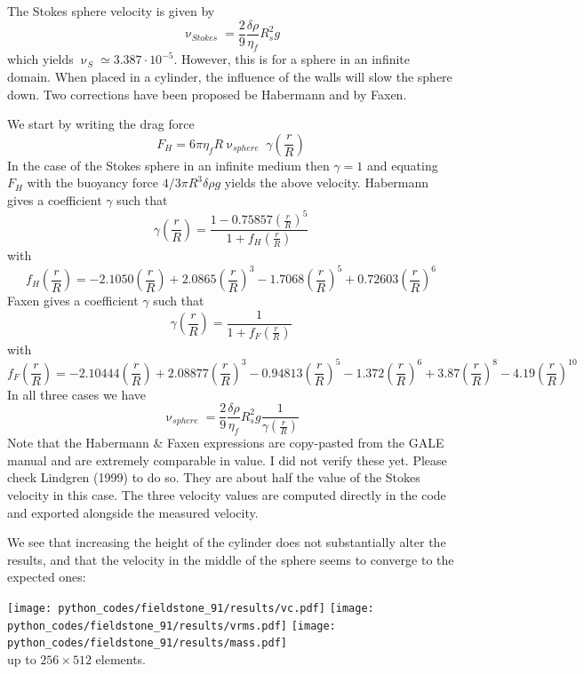 The Stokes sphere velocity is given by
\[
\upnu_{Stokes} = \frac{2}{9} \frac{\delta \rho}{\eta_f} R_s^2 g
\]
which yields $\upnu_S\simeq 3.387 \cdot 10^{-5}$. However, 
this is for a sphere in an infinite domain. When placed in a 
cylinder, the influence of the walls will slow the sphere down. 
Two corrections have been proposed be Habermann and by Faxen.

We start by writing the drag force
\[
F_H = 6 \pi \eta_f R \upnu_{sphere}\;  \gamma\left(\frac{r}{R}\right) 
\]
In the case of the Stokes sphere in an infinite medium then $\gamma =1$ and equating
$F_H$ with the buoyancy force $4/3 \pi R^3 \delta\rho g$ yields the above velocity.
Habermann gives a coefficient $\gamma$ such that 
\[
\gamma\left(\frac{r}{R}\right)  = 
\frac{1-0.75857 \left(\frac{r}{R}\right)^5}{1+f_H\left(\frac{r}{R}\right)}
\]
with 
\[
f_H\left(\frac{r}{R}\right) 
= -2.1050\left(\frac{r}{R}\right)+ 2.0865\left(\frac{r}{R}\right)^3
- 1.7068\left(\frac{r}{R}\right)^5 + 0.72603\left(\frac{r}{R}\right)^6 
\]
Faxen gives a coefficient $\gamma$ such that 
\[
\gamma\left(\frac{r}{R}\right) = \frac{1}{1 + f_F\left(\frac{r}{R}\right)} 
\]
with 
\[
f_F\left(\frac{r}{R}\right) 
= -2.10444 \left(\frac{r}{R}\right) 
+ 2.08877\left(\frac{r}{R}\right)^3 
- 0.94813\left(\frac{r}{R}\right)^5 
- 1.372\left(\frac{r}{R}\right)^6 
+ 3.87\left(\frac{r}{R}\right)^8 
- 4.19\left(\frac{r}{R}\right)^{10}
\]
In all three cases we have 
\[
\upnu_{sphere} = \frac{2}{9} \frac{\delta \rho}{\eta_f} R_s^2 g \frac{1}{\gamma(\frac{r}{R})}
\]
Note that the Habermann \& Faxen expressions are copy-pasted from the GALE manual and 
are extremely comparable in value. I did not verify these yet. 
Please check Lindgren (1999) \cite{lind99} to do so. They are 
about half the value of the Stokes velocity
in this case. The three velocity values are computed directly in the 
code and exported alongside
the measured velocity.

We see that increasing the height of the cylinder does not substantially 
alter the results, and that 
the velocity in the middle of the sphere seems to converge to the expected ones:
\begin{center}
\texttt{[image: python\_codes/fieldstone\_91/results/vc.pdf]}
\texttt{[image: python\_codes/fieldstone\_91/results/vrms.pdf]}
\texttt{[image: python\_codes/fieldstone\_91/results/mass.pdf]}\\
{\captionfont up to $256 \times 512$ elements.}
\end{center}


